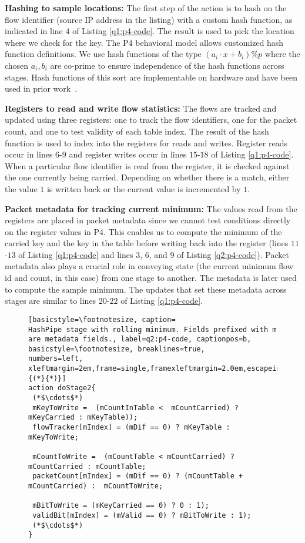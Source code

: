 \noindent \textbf{Hashing to sample locations:} The first step of the action is
to hash on the flow identifier (source IP address in the listing) with a custom
hash function, as indicated in line $4$ of Listing \ref{q1:p4-code}. The result
is used to pick the location where we check for the key. The P4
behavioral model \cite{p4-bm} allows customized hash function definitions. We
use hash functions of the type $(a_i\cdot x + b_i)\%p$ where the chosen $a_i,
b_i$ are co-prime to ensure independence of the hash functions across
stages. Hash functions of this sort are implementable on hardware and have
been used in prior work~\cite{univmon,li2016flowradar}.

\noindent \textbf{Registers to read and write flow statistics:} The flows are
tracked and updated using three registers: one to track the flow identifiers,
one for the packet count, and one to test validity of each table index. The
result of the hash function is used to index into the registers for reads and
writes. Register reads occur in lines $6$-$9$ and register writes occur in lines
$15$-$18$ of Listing \ref{q1:p4-code}. When a particular flow identifier is read
from the register, it is checked against the one currently being
carried. Depending on whether there is a match, either the value $1$ is written
back or the current value is incremented by $1$.

\noindent \textbf{Packet metadata for tracking current minimum:} The values read
from the registers are placed in packet metadata since we cannot test conditions
directly on the register values in P4. This enables us to compute the minimum of
the carried key and the key in the table before writing back into the register
(lines $11$-$13$ of Listing \ref{q1:p4-code} and lines $3$, $6$, and $9$ of
Listing \ref{q2:p4-code}). Packet metadata also plays a crucial role in
conveying state (the current minimum flow id and count, in this case) from one
stage to
another. The metadata is later used to compute the sample minimum. The updates
that
set these
metadata across stages are similar to lines $20$-$22$ of Listing
\ref{q1:p4-code}.

\begin{figure}
 \begin{lstlisting}[basicstyle=\footnotesize, caption=
HashPipe stage with rolling minimum. Fields prefixed with m are metadata fields., label=q2:p4-code, captionpos=b, basicstyle=\footnotesize, breaklines=true,
numbers=left, xleftmargin=2em,frame=single,framexleftmargin=2.0em,escapeinside={(*}{*)}]
action doStage2{
 (*$\cdots$*)
 mKeyToWrite =  (mCountInTable <  mCountCarried) ? mKeyCarried : mKeyTable));
 flowTracker[mIndex] = (mDif == 0) ? mKeyTable : mKeyToWrite;

 mCountToWrite =  (mCountTable < mCountCarried) ? mCountCarried : mCountTable;
 packetCount[mIndex] = (mDif == 0) ? (mCountTable + mCountCarried) :  mCountToWrite;

 mBitToWrite = (mKeyCarried == 0) ? 0 : 1);
 validBit[mIndex] = (mValid == 0) ? mBitToWrite : 1);
 (*$\cdots$*)
}
\end{lstlisting}
\end{figure}


